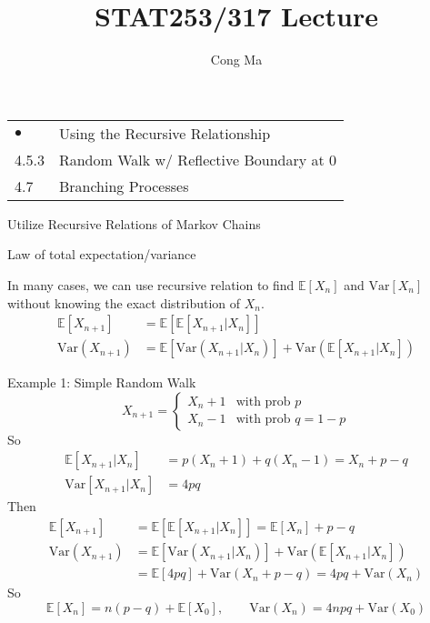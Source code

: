 \documentclass[letterpaper,handout, mathserif]{beamer}
\title{STAT253/317 Lecture \chapnum}
\date{}
\author{Cong Ma}
\def\E{\mathbb E}
\def\V{\mathrm{Var}}
\begin{document}
\begin{frame}\maketitle
\begin{center}
\begin{tabular}{ll}
$\bullet$ & Using the Recursive Relationship\\
4.5.3 & Random Walk w/ Reflective Boundary at 0\\
4.7   & Branching Processes
\end{tabular}
\end{center}
\end{frame}
\begin{frame}{Utilize Recursive Relations of Markov Chains}

Law of total expectation/variance

\medskip

In many cases, we can use recursive relation to find $\E[X_n]$ and $\V[X_n]$ without knowing the exact distribution of $X_n$.
\begin{align*}
\E[X_{n+1}]&=\E[\E[X_{n+1}|X_{n}]]\\
\V(X_{n+1})&= \E[\V(X_{n+1}|X_{n})] + \V(\E[X_{n+1}|X_{n}])
\end{align*}
\end{frame}
\begin{frame}{Example 1: Simple Random Walk}
$$
X_{n+1}=
\begin{cases}
X_n + 1 & \text{with prob }p\\
X_n - 1 & \text{with prob }q=1-p
\end{cases}
$$
So
\begin{align*}
\E[X_{n+1}|X_n] &= p (X_n+1) + q(X_n-1) = X_n + p-q\\
\V[X_{n+1}|X_n] &= 4pq
\end{align*}
Then
\begin{align*}
\E[X_{n+1}]&=\E[\E[X_{n+1}|X_n]] = \E[X_n] + p-q\\
\V(X_{n+1})&= \E[\V(X_{n+1}|X_{n})] + \V(\E[X_{n+1}|X_{n}])\\
&=\E[4pq]+\V(X_n + p-q) = 4pq + \V(X_n)
\end{align*}
So
$$
\E[X_n]=n(p-q)+\E[X_0],\qquad \V(X_n) = 4npq + \V(X_0)
$$
\end{frame}
\end{document}
